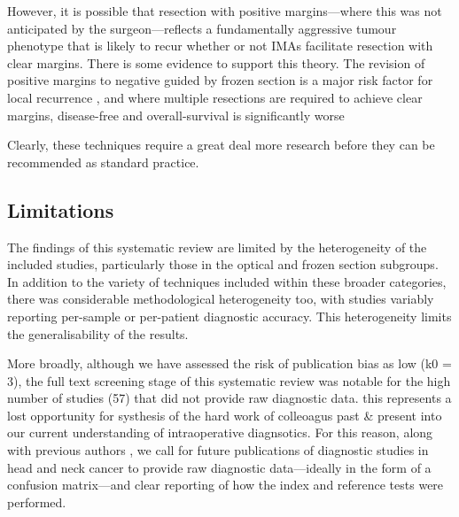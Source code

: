 However, it is possible that resection with positive margins---where this was not anticipated by the surgeon---reflects a fundamentally aggressive tumour phenotype that is likely to recur whether or not IMAs facilitate resection with clear margins.
There is some evidence to support this theory.
The revision of positive margins to negative guided by frozen section is a major risk factor for local recurrence \cite{ettlt.PositiveFrozenSection2016}, and where multiple resections are required to achieve clear margins, disease-free and overall-survival is significantly worse \cite{mooreTransoralRoboticSurgery2018}

Clearly, these techniques require a great deal more research before they can be recommended as standard practice.

\subsection{Limitations}

The findings of this systematic review are limited by the heterogeneity of the included studies, particularly those in the optical and frozen section subgroups.
In addition to the variety of techniques included within these broader categories, there was considerable methodological heterogeneity too, with studies variably reporting per-sample or per-patient diagnostic accuracy.
This heterogeneity limits the generalisability of the results.

More broadly, although we have assessed the risk of publication bias as low (k0 = 3), the full text screening stage of this systematic review was notable for the high number of studies (57) that did not provide raw diagnostic data.
this represents a lost opportunity for systhesis of the hard work of colleoagus past \& present into our current understanding of intraoperative diagnsotics.
For this reason, along with previous authors \cite{stjohnDiagnosticAccuracyIntraoperative2017, irwigGuidelinesMetaanalysesEvaluating1994}, we call for future publications of diagnostic studies in head and neck cancer to provide raw diagnostic data---ideally in the form of a confusion matrix---and clear reporting of how the index and reference tests were performed.
